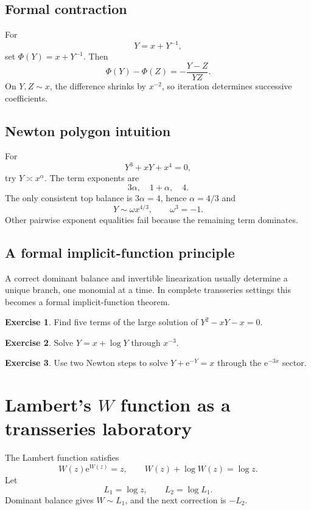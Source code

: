 \documentclass[11pt,oneside,openany]{book}
\newcommand{\e}{\mathrm{e}}
\theoremstyle{plain}
\theoremstyle{definition}
\newtheorem{exercise}{Exercise}[chapter]
\theoremstyle{remark}
\begin{document}
\section{Formal contraction}
For
\[
  Y=x+Y^{-1},
\]
set $\Phi(Y)=x+Y^{-1}$. Then
\[
  \Phi(Y)-\Phi(Z)=-\frac{Y-Z}{YZ}.
\]
On $Y,Z\sim x$, the difference shrinks by $x^{-2}$, so iteration determines successive coefficients.

\section{Newton polygon intuition}
For
\[
  Y^3+xY+x^4=0,
\]
try $Y\asymp x^\alpha$. The term exponents are
\[
  3\alpha,
  \quad1+\alpha,
  \quad4.
\]
The only consistent top balance is $3\alpha=4$, hence $\alpha=4/3$ and
\[
  Y\sim\omega x^{4/3},
  \qquad\omega^3=-1.
\]
Other pairwise exponent equalities fail because the remaining term dominates.

\section{A formal implicit-function principle}
A correct dominant balance and invertible linearization usually determine a unique branch, one monomial at a time. In complete transseries settings this becomes a formal implicit-function theorem.

\begin{exercise}
Find five terms of the large solution of $Y^2-xY-x=0$.
\end{exercise}

\begin{exercise}
Solve $Y=x+\log Y$ through $x^{-3}$.
\end{exercise}

\begin{exercise}
Use two Newton steps to solve $Y+\e^{-Y}=x$ through the $\e^{-3x}$ sector.
\end{exercise}


\chapter{Lambert's \texorpdfstring{$W$}{W} function as a transseries laboratory}
\label{ch:lambert-w}

The Lambert function satisfies
\[
  W(z)\e^{W(z)}=z,
  \qquad W(z)+\log W(z)=\log z.
\]
Let
\[
  L_1=\log z,
  \qquad L_2=\log L_1.
\]
Dominant balance gives $W\sim L_1$, and the next correction is $-L_2$.
\end{document}

